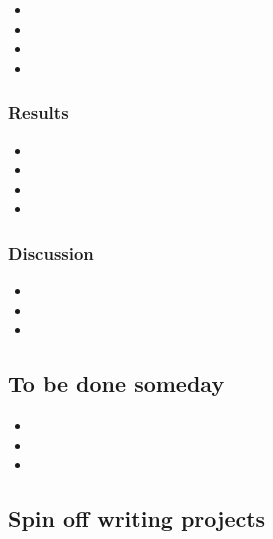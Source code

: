 \documentclass[11pt,letterpaper]{article}
\begin{document}
\begin{itemize}
\item 

\item 

\item 

\item 
\end{itemize}

\subsubsection{Results}
\label{sec:org45d9248}


\begin{itemize}
\item 

\item 

\item 

\item 
\end{itemize}

\subsubsection{Discussion}
\label{sec:org5df3313}


\begin{itemize}
\item 

\item 

\item 
\end{itemize}

\subsection{To be done someday}
\label{sec:org2468c91}


\begin{itemize}
\item 

\item 

\item 
\end{itemize}

\subsection{Spin off writing projects}
\label{sec:org9916048}
\end{document}
